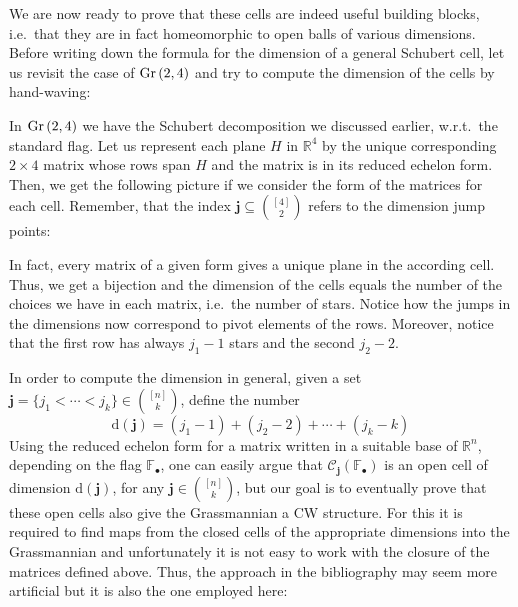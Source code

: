 We are now ready to prove that these cells are indeed useful building blocks, i.e.\ that they are in fact homeomorphic to open balls of various dimensions. Before writing down the formula for the dimension of a general Schubert cell, let us revisit the case of $\Gr{2}{4}$ and try to compute the dimension of the cells by hand-waving:

\begin{example} In $\Gr{2}{4}$ we have the Schubert decomposition we discussed earlier, w.r.t.\ the standard flag. Let us represent each plane $H$ in $\mathbb{R}^4$ by the unique corresponding $2\times 4$ matrix whose rows span $H$ and the matrix is in its reduced echelon form. Then, we get the following picture if we consider the form of the matrices for each cell. Remember, that the index $\mathbf{j}\subseteq\binom{[4]}{2}$ refers to the dimension jump points:
\begin{center}
\end{center}
In fact, every matrix of a given form gives a unique plane in the according cell. Thus, we get a bijection and the dimension of the cells equals the number of the choices we have in each matrix, i.e.\ the number of stars. Notice how the jumps in the dimensions now correspond to pivot elements of the rows. Moreover, notice that the first row has always $j_1-1$ stars and the second $j_2-2$.
\end{example}

In order to compute the dimension in general, given a set $\mathbf{j}=\{j_1<\cdots<j_k\}\in\binom{[n]}{k}$, define the number
\[\mathrm{d}(\mathbf{j})=(j_1-1)+(j_2-2)+\cdots+(j_k-k)\]
Using the reduced echelon form for a matrix written in a suitable base of $\mathbb{R}^n$, depending on the flag $\mathbb{F}_{\bullet}$, one can easily argue that $\mathcal{C}_{\mathbf{j}}\left(\mathbb{F}_{\bullet}\right)$ is an open cell of dimension $\mathrm{d}(\mathbf{j})$, for any $\mathbf{j}\in\binom{[n]}{k}$, but our goal is to eventually prove that these open cells also give the Grassmannian a CW structure. For this it is required to find maps from the closed cells of the appropriate dimensions into the Grassmannian and unfortunately it is not easy to work with the closure of the matrices defined above. Thus, the approach in the bibliography may seem more artificial but it is also the one employed here:

